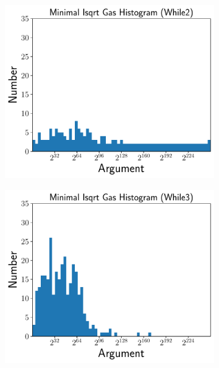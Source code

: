 \begin{figure}[p]
    \begin{subfigure}[t]{0.45\textwidth}
    \includegraphics[width=\textwidth]{plots/minimal_hist_While2.pdf}
    \end{subfigure}
    \begin{subfigure}[t]{0.45\textwidth}
    \includegraphics[width=\textwidth]{plots/minimal_hist_While3.pdf}
    \end{subfigure}


\end{figure}
